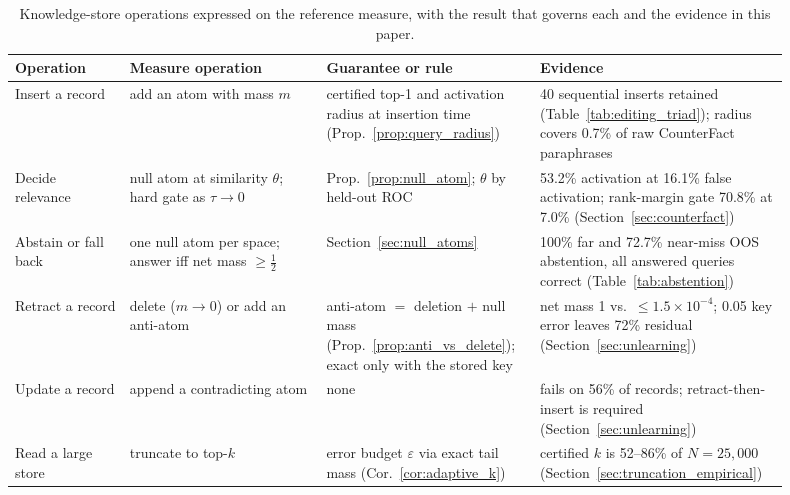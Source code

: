 \documentclass[preprint,12pt]{elsarticle}
\newif\ifmarkchanges
\newcommand{\revii}[1]{\ifmarkchanges{\color{blue}#1}\else#1\fi} %
\begin{document}
\begin{table}[t]
\centering
\caption{\revii{Knowledge-store operations expressed on the reference measure, with the result that governs each and the evidence in this paper.}}
\label{tab:kb_ops}
\vspace{0.5em}
\footnotesize
\begin{tabular}{@{}L{0.14\linewidth}L{0.24\linewidth}L{0.24\linewidth}L{0.28\linewidth}@{}}
\toprule
\revii{Operation} & \revii{Measure operation} & \revii{Guarantee or rule} & \revii{Evidence} \\
\midrule
\revii{Insert a record} & \revii{add an atom with mass $m$} & \revii{certified top-1 and activation radius at insertion time (Prop.~\ref{prop:query_radius})} & \revii{40 sequential inserts retained (Table~\ref{tab:editing_triad}); radius covers 0.7\% of raw CounterFact paraphrases} \\
\revii{Decide relevance} & \revii{null atom at similarity $\theta$; hard gate as $\tau\to0$} & \revii{Prop.~\ref{prop:null_atom}; $\theta$ by held-out ROC} & \revii{53.2\% activation at 16.1\% false activation; rank-margin gate 70.8\% at 7.0\% (Section~\ref{sec:counterfact})} \\
\revii{Abstain or fall back} & \revii{one null atom per space; answer iff net mass $\ge\tfrac12$} & \revii{Section~\ref{sec:null_atoms}} & \revii{100\% far and 72.7\% near-miss OOS abstention, all answered queries correct (Table~\ref{tab:abstention})} \\
\revii{Retract a record} & \revii{delete ($m\to0$) or add an anti-atom} & \revii{anti-atom $=$ deletion $+$ null mass (Prop.~\ref{prop:anti_vs_delete}); exact only with the stored key} & \revii{net mass 1 vs.\ $\le1.5\times10^{-4}$; 0.05 key error leaves 72\% residual (Section~\ref{sec:unlearning})} \\
\revii{Update a record} & \revii{append a contradicting atom} & \revii{none} & \revii{fails on 56\% of records; retract-then-insert is required (Section~\ref{sec:unlearning})} \\
\revii{Read a large store} & \revii{truncate to top-$k$} & \revii{error budget $\varepsilon$ via exact tail mass (Cor.~\ref{cor:adaptive_k})} & \revii{certified $k$ is 52--86\% of $N=25{,}000$ (Section~\ref{sec:truncation_empirical})} \\
\bottomrule
\end{tabular}
\end{table}
\end{document}
